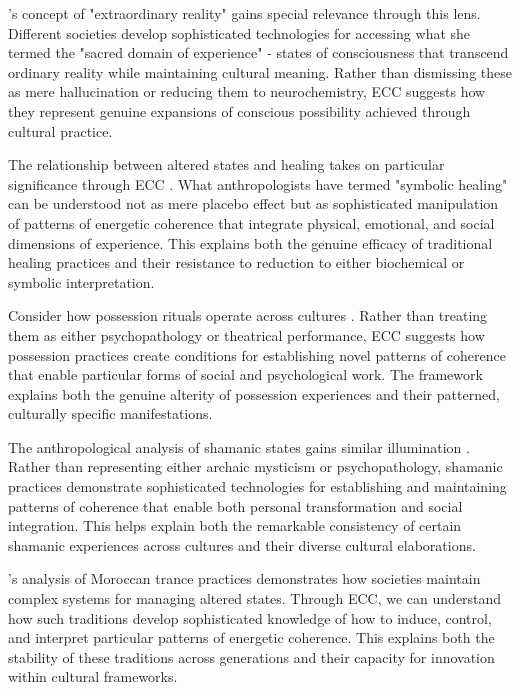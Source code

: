 \begin{refsection}
\cite{myerhoff1974peyote}'s concept of "extraordinary reality" gains special relevance through this lens. Different societies develop sophisticated technologies for accessing what she termed the "sacred domain of experience" - states of consciousness that transcend ordinary reality while maintaining cultural meaning. Rather than dismissing these as mere hallucination or reducing them to neurochemistry, ECC suggests how they represent genuine expansions of conscious possibility achieved through cultural practice.

The relationship between altered states and healing takes on particular significance through ECC \cite{csordas2002body}. What anthropologists have termed "symbolic healing" can be understood not as mere placebo effect but as sophisticated manipulation of patterns of energetic coherence that integrate physical, emotional, and social dimensions of experience. This explains both the genuine efficacy of traditional healing practices and their resistance to reduction to either biochemical or symbolic interpretation.

Consider how possession rituals operate across cultures \cite{boddy1994spirit}. Rather than treating them as either psychopathology or theatrical performance, ECC suggests how possession practices create conditions for establishing novel patterns of coherence that enable particular forms of social and psychological work. The framework explains both the genuine alterity of possession experiences and their patterned, culturally specific manifestations.

The anthropological analysis of shamanic states gains similar illumination \cite{noll1983shamanism}. Rather than representing either archaic mysticism or psychopathology, shamanic practices demonstrate sophisticated technologies for establishing and maintaining patterns of coherence that enable both personal transformation and social integration. This helps explain both the remarkable consistency of certain shamanic experiences across cultures and their diverse cultural elaborations.

\cite{crapanzano1973hamadsha}'s analysis of Moroccan trance practices demonstrates how societies maintain complex systems for managing altered states. Through ECC, we can understand how such traditions develop sophisticated knowledge of how to induce, control, and interpret particular patterns of energetic coherence. This explains both the stability of these traditions across generations and their capacity for innovation within cultural frameworks.


\end{refsection}
